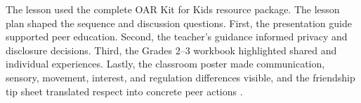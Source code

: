 The lesson used the complete OAR Kit for Kids resource package. The lesson plan shaped the sequence and discussion questions. First, the presentation guide supported peer education. Second, the teacher's guidance informed privacy and disclosure decisions. Third, the Grades 2--3 workbook highlighted shared and individual experiences. Lastly, the classroom poster made communication, sensory, movement, interest, and regulation differences visible, and the friendship tip sheet translated respect into concrete peer actions \citep{oarKitLessonPlan,oarHowToUse,oarHelpfulTips,oarWorkbook23,oarFriendship23,oarClassroomPoster,oarNickBooklet}.